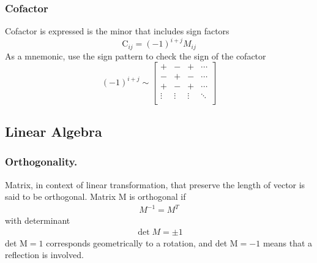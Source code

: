 \documentclass[../main.tex]{subfiles}
\begin{document}
\subsubsection*{Cofactor}
Cofactor is expressed is the minor that includes sign factors
\begin{equation*}
	\text{C}_{ij}=(-1)^{i+j}M_{ij}
\end{equation*}
As a mnemonic, use the sign pattern to check the sign of the cofactor
\begin{equation*}
	(-1)^{i+j}\sim
	\begin{bmatrix}
		+      & -      & +      & \cdots \\
		-      & +      & -      & \cdots \\
		+      & -      & +      & \cdots \\
		\vdots & \vdots & \vdots & \ddots \\
	\end{bmatrix}
\end{equation*}

\subsection*{Linear Algebra}
\subsubsection*{Orthogonality.} Matrix, in context of linear transformation, that preserve the length of vector is said to be orthogonal.
Matrix M is orthogonal if
\begin{align*}
	M^{-1}=M^T
\end{align*}
with determinant
\begin{align*}
	\det M = \pm 1
\end{align*}
det $\text{M} = 1$ corresponds geometrically to a rotation, and det $\text{M} = -1$ means that a reflection is involved.
\end{document}
